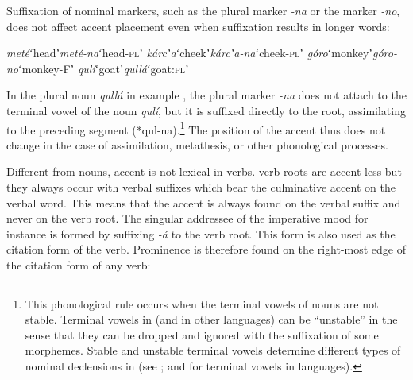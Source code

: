 \documentclass[output=paper,modfonts,nonflat,hidelinks]{langsci/langscibook}
\begin{document}
\largerpage
Suffixation of nominal markers, such as the plural marker \textit{-na} or the   marker \textit{-no}, does not affect accent placement even when suffixation results in longer words:

\begin{exe} 
	\ex \label{ex:Petrollino:nominflections} \begin{xlist}
	\ex \textit{meté}\hspace{12mm}ʻheadʼ\hspace{9mm}\textit{meté-na}\hspace{4mm}ʻhead-\textsc{pl}ʼ
    \ex \textit{kárcʼa}\hspace{10mm}ʻcheekʼ\hspace{8mm}\textit{kárcʼa-na}\hspace{2mm}ʻcheek-\textsc{pl}ʼ
    \ex \textit{góro}\hspace{13mm}ʻmonkeyʼ\hspace{4mm}\textit{góro-no}\hspace{5mm}ʻmonkey-Fʼ
    \ex \textit{qulí}\hspace{13mm}ʻgoatʼ\hspace{10mm}\textit{qullá}\hspace{9mm}ʻgoat:\textsc{pl}ʼ\label{ex:Petrollino:qullá}
\end{xlist}
\end{exe}
In the plural noun \textit{qullá} in example , the plural marker \textit{-na} does not attach to the terminal vowel of the noun \textit{qulí}, but it is suffixed directly to the root, assimilating to the preceding  segment (*qul-na).\footnote{This phonological rule occurs when the terminal vowels of nouns are not stable. Terminal vowels in  (and in other  languages) can be “unstable” in the sense that they can be dropped and ignored with the suffixation of some morphemes. Stable and unstable terminal vowels determine different types of nominal declensions in  (see \citealt[73-77]{Petrollino2016}; \citealt{Hayward1987} and \citealt{Azeb2012} for terminal vowels in  languages).} The position of the accent thus does not change in the case of assimilation, metathesis, or other phonological processes.

Different from nouns, accent is not lexical in verbs.  verb roots are accent-less but they always occur with verbal suffixes which bear the culminative accent on the verbal word. This means that the accent is always found on the verbal suffix and never on the verb root. The singular addressee of the imperative mood for instance is formed by suffixing \textit{-á} to the verb root. This form is also used as the citation form of the verb. Prominence is therefore found on the right-most edge of the citation form of any verb:
\end{document}
